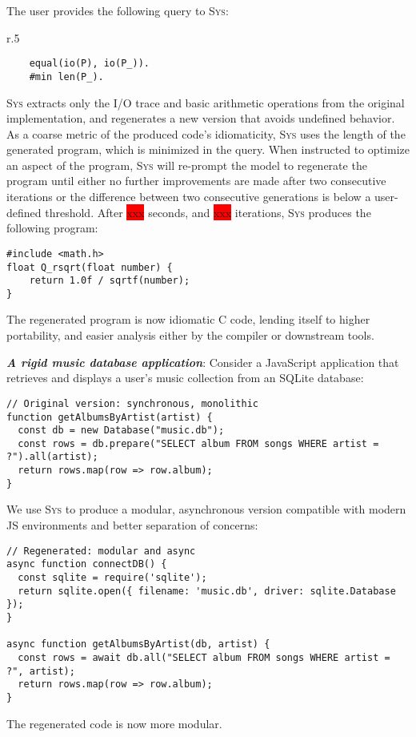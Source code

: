 \documentclass[sigplan]{acmart}
\newcommand{\sys}{{\scshape Sys}\xspace}
\newcommand{\heading}[1]{\vspace{2pt}\noindent\textbf{\emph{#1}}:\enspace}
\newcommand{\xxx}{\colorbox{red}{xxx}\xspace}
\begin{document}
The user provides the following query to \sys:
\begin{wrapfigure}[3]{r}{.5\columnwidth}
  \vspace{-10pt}
  \begin{verbatim}
    equal(io(P), io(P_)).
    #min len(P_).
  \end{verbatim}
\end{wrapfigure}
\sys extracts only the I/O trace and basic arithmetic operations from the
original implementation, and regenerates a new version that avoids undefined
behavior.
As a coarse metric of the produced code's idiomaticity, \sys uses the
length of the generated program, which is minimized in the query.
When instructed to optimize an aspect of the program, \sys will re-prompt
the model to regenerate the program until either no further improvements are made after two consecutive iterations or
the difference between two consecutive generations is below a user-defined threshold.
After \xxx seconds, and \xxx iterations, \sys produces the following program:
\begin{verbatim}
#include <math.h>
float Q_rsqrt(float number) {
    return 1.0f / sqrtf(number);
}
\end{verbatim}
The regenerated program is now idiomatic C code, lending itself 
to higher portability, and easier analysis either by the compiler 
or downstream tools.

\heading{A rigid music database application}
Consider a JavaScript application that retrieves and displays a user's music
collection from an SQLite database:

\begin{verbatim}
// Original version: synchronous, monolithic
function getAlbumsByArtist(artist) {
  const db = new Database("music.db");
  const rows = db.prepare("SELECT album FROM songs WHERE artist = ?").all(artist);
  return rows.map(row => row.album);
}
\end{verbatim}
We use \sys to produce a modular, asynchronous version compatible with modern
JS environments and better separation of concerns:

\begin{verbatim}
// Regenerated: modular and async
async function connectDB() {
  const sqlite = require('sqlite');
  return sqlite.open({ filename: 'music.db', driver: sqlite.Database });
}

async function getAlbumsByArtist(db, artist) {
  const rows = await db.all("SELECT album FROM songs WHERE artist = ?", artist);
  return rows.map(row => row.album);
}
\end{verbatim}
The regenerated code is now more modular.
\end{document}
